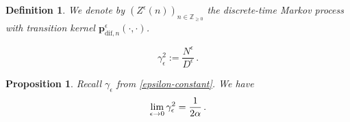 \documentclass[10pt,a4paper]{amsart}
\newtheorem{proposition}[theorem]{Proposition}
\newtheorem{definition}[theorem]{Definition}
\renewcommand{\geq}{\geqslant}
\begin{document}
\begin{definition}\label{remark-Zn}
	We denote by $(Z^{\epsilon}(n))_{n\in \mathbb{Z}_{\geq 0}}$ the discrete-time Markov process with transition kernel $\mathbf{p}_{\text{dif},n}^{\epsilon}(\cdot,\cdot)$. 
\end{definition}

\begin{equation}\label{epsilon-constant}
	\gamma_{\epsilon}^{2}:=\frac{N^{\epsilon}}{D^{\epsilon}}\,.
\end{equation}

\begin{proposition}\label{proposition-limitingConstant}
	Recall $\gamma_{\epsilon}$ from \eqref{epsilon-constant}. We have
	\begin{equation}\label{statement-proposition-gamma}
		\lim_{\epsilon\to 0}\gamma_{\epsilon}^{2}=\frac{1}{{\color{black}2}\alpha}\,.
	\end{equation}
\end{proposition}
\end{document}
